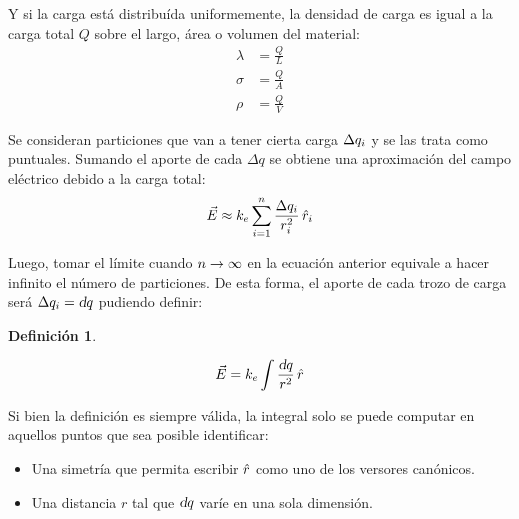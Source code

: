 \documentclass[a5paper,12pt,twoside]{book}
\newtheorem{defn}{{Definición}}[chapter]
\begin{document}
Y si la carga está distribuída uniformemente, la densidad de carga es igual a la carga total $Q$ sobre el largo, área o volumen del material:
\begin{align*}
    \lambda &= \frac{Q}{L}
    \\[1ex]
    \sigma &= \frac{Q}{A}
    \\[1ex]
    \rho &= \frac{Q}{V}
\end{align*}

Se consideran particiones que van a tener cierta carga $\Delta q_i$ y se las trata como puntuales. Sumando el aporte de cada $\Delta q$ se obtiene una aproximación del campo eléctrico debido a la carga total:
\begin{equation*}
    \Vec{E} \approx k_e \sum_{i=1}^n \frac{\Delta q_i}{r_i^2} \, \hat{r}_i
\end{equation*}

Luego, tomar el límite cuando $n\to\infty$ en la ecuación anterior equivale a hacer infinito el número de particiones. De esta forma, el aporte de cada trozo de carga será $\Delta q_i = \textsl{d} q$ pudiendo definir:

\begin{mdframed}[style=MyFrame1]
    \begin{defn}
    \end{defn}
    \begin{equation*}
        \Vec{E} = k_e \int \frac{\textsl{d} q}{r^2} \, \hat{r}
    \end{equation*}
\end{mdframed}

Si bien la definición es siempre válida, la integral solo se puede computar en aquellos puntos que sea posible identificar:
\begin{itemize}
    \item Una simetría que permita escribir $\hat{r}$ como uno de los versores canónicos.
    \item Una distancia $r$ tal que $\textsl{d} q$ varíe en una sola dimensión.
\end{itemize}
\end{document}
